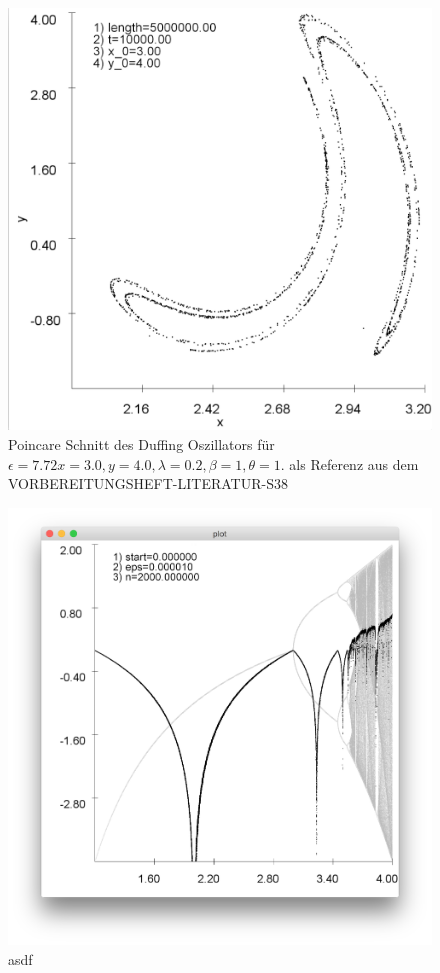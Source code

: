 \documentclass{scrartcl}
\begin{document}
\begin{figure}
	\centering
	\includegraphics[scale=0.20]{poincare-772}
	\caption{Poincare Schnitt des Duffing Oszillators für $\epsilon=7.72 x=3.0, y=4.0, \lambda=0.2, \beta=1, \theta=1$. als Referenz aus dem VORBEREITUNGSHEFT-LITERATUR-S38}
	\label{img:poincare-772}
\end{figure}

\begin{figure}
	\centering
	\includegraphics[scale=0.60]{lyapunov-log}
	\caption{asdf}
	\label{img:lyapunov-log}
\end{figure}
\end{document}
